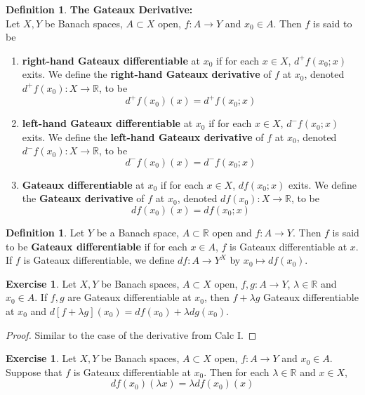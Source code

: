 \documentclass[12pt]{amsart}
\theoremstyle{definition}
\newtheorem{defn}[definition]{Definition}
\theoremstyle{remark}
\theoremstyle{definition}
\newtheorem{ex}[definition]{Exercise}
\newcommand{\lam}{\lambda}
\newcommand{\R}{\mathbb{R}}
\begin{document}
	\begin{defn}\textbf{The Gateaux Derivative:}\\
	Let $X,Y$ be Banach spaces, $A \subset X$ open, $f:A \rightarrow Y$ and $x_0 \in A$. Then $f$ is said to be 
	\begin{enumerate}
	\item \textbf{right-hand Gateaux differentiable} at $x_0$ if for each $x \in X$, $d^+ f(x_0; x)$ exits. We define the \textbf{right-hand Gateaux derivative} of $f$ at $x_0$, denoted $d^+ f(x_0) : X \rightarrow \R$, to be $$d^+ f(x_0)(x) = d^+ f(x_0;x)$$ 
	
	\item \textbf{left-hand Gateaux differentiable} at $x_0$ if for each $x \in X$, $d^- f(x_0; x)$ exits. We define the \textbf{left-hand Gateaux derivative} of $f$ at $x_0$, denoted $d^- f(x_0) : X \rightarrow \R$, to be $$d^- f(x_0)(x) = d^- f(x_0;x)$$
	
	\item \textbf{Gateaux differentiable} at $x_0$ if for each $x \in X$, $d f(x_0; x)$ exits. We define the \textbf{Gateaux derivative} of $f$ at $x_0$, denoted $d f(x_0) : X \rightarrow \R$, to be $$d f(x_0)(x) = d f(x_0;x)$$
	\end{enumerate}
	\end{defn}
	
	\begin{defn}
Let $Y$ be a Banach space, $A \subset \R$ open and $f:A \rightarrow Y$. Then $f$ is said to be \textbf{Gateaux differentiable} if for each $x \in A$, $f$ is Gateaux differentiable at $x$. If $f$ is Gateaux differentiable, we define $df:A \rightarrow Y^X$ by $x_0 \mapsto df(x_0)$.
\end{defn}	
	
	\begin{ex}
	Let $X, Y$ be Banach spaces, $A \subset X$ open, $f,g :A \rightarrow Y$, $\lam \in \R$ and $x_0 \in A$. If $f, g$ are Gateaux differentiable at $x_0$, then $f + \lam g$ Gateaux differentiable at $x_0$ and $d[f+\lam g](x_0) = df(x_0) + \lam dg(x_0)$.
	\end{ex}
	
	\begin{proof}
	Similar to the case of the derivative from Calc I. 
	\end{proof}		
	
	\begin{ex}
	Let $X, Y$ be Banach spaces, $A \subset X$ open, $f:A \rightarrow Y$ and $x_0 \in A$. Suppose that $f$ is Gateaux differentiable at $x_0$. Then for each $\lam \in \R$ and $x \in X$, $$df(x_0)(\lam x) = \lam df(x_0)(x)$$
	\end{ex}
	
\end{document}
